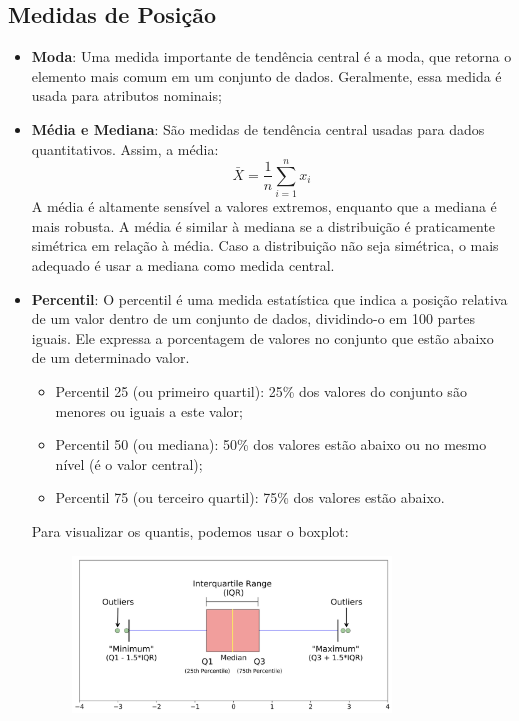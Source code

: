 \documentclass{article}
\begin{document}
\subsection{Medidas de Posição}
\begin{itemize}
    \item \textbf{Moda}: Uma medida importante de tendência central é a moda, que retorna o elemento mais comum em um conjunto de dados. Geralmente, essa medida é usada para atributos nominais;
    \item \textbf{Média e Mediana}: São medidas de tendência central usadas para dados quantitativos. Assim, a média:
    $$
    \bar{X} = \frac{1}{n} \sum_{i=1}^n x_i
    $$
    A média é altamente sensível a valores extremos, enquanto que a mediana é mais robusta.
    A média é similar à mediana se a distribuição é praticamente simétrica em relação à média. Caso a distribuição não seja simétrica, o mais adequado é usar a mediana como medida central.
    \item \textbf{Percentil}: O percentil é uma medida estatística que indica a posição relativa de um valor dentro de um conjunto de dados, dividindo-o em 100 partes iguais. Ele expressa a porcentagem de valores no conjunto que estão abaixo de um determinado valor.
    \begin{itemize}
        \item Percentil 25 (ou primeiro quartil): 25\% dos valores do conjunto são menores ou iguais a este valor;
        \item Percentil 50 (ou mediana): 50\% dos valores estão abaixo ou no mesmo nível (é o valor central);
        \item Percentil 75 (ou terceiro quartil): 75\% dos valores estão abaixo.
    \end{itemize}
    Para visualizar os quantis, podemos usar o boxplot:
    \begin{figure}[H]
        \centering
        \includegraphics[width=0.8\textwidth]{figuras/boxplot.png}
    \end{figure}
\end{itemize}
\end{document}
